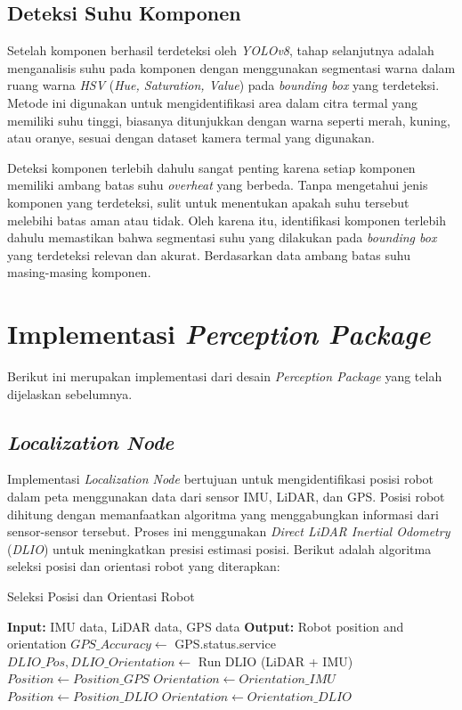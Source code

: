\subsection{Deteksi Suhu Komponen}
Setelah komponen berhasil terdeteksi oleh \emph{YOLOv8}, tahap selanjutnya adalah menganalisis suhu pada komponen dengan menggunakan segmentasi warna dalam ruang warna \emph{HSV} (\emph{Hue, Saturation, Value}) pada \emph{bounding box} yang terdeteksi. Metode ini digunakan untuk mengidentifikasi area dalam citra termal yang memiliki suhu tinggi, biasanya ditunjukkan dengan warna seperti merah, kuning, atau oranye, sesuai dengan dataset kamera termal yang digunakan.

Deteksi komponen terlebih dahulu sangat penting karena setiap komponen memiliki ambang batas suhu \emph{overheat} yang berbeda. Tanpa mengetahui jenis komponen yang terdeteksi, sulit untuk menentukan apakah suhu tersebut melebihi batas aman atau tidak. Oleh karena itu, identifikasi komponen terlebih dahulu memastikan bahwa segmentasi suhu yang dilakukan pada \emph{bounding box} yang terdeteksi relevan dan akurat. Berdasarkan data ambang batas suhu masing-masing komponen.

\section{Implementasi \emph{Perception Package}}
Berikut ini merupakan implementasi dari desain \emph{Perception Package} yang telah dijelaskan sebelumnya.

\subsection{\emph{Localization Node}}
Implementasi \emph{Localization Node} bertujuan untuk mengidentifikasi posisi robot dalam peta menggunakan data dari sensor IMU, LiDAR, dan GPS. Posisi robot dihitung dengan memanfaatkan algoritma yang menggabungkan informasi dari sensor-sensor tersebut. Proses ini menggunakan \emph{Direct LiDAR Inertial Odometry} (\emph{DLIO}) untuk meningkatkan presisi estimasi posisi. Berikut adalah algoritma seleksi posisi dan orientasi robot yang diterapkan:

\begin{algorithm}
    \caption{Seleksi Posisi dan Orientasi Robot}
    \begin{algorithmic}[1]
    \State \textbf{Input:} IMU data, LiDAR data, GPS data
    \State \textbf{Output:} Robot position and orientation
    \State $GPS\_Accuracy \gets$ GPS.status.service
    \State $DLIO\_Pos, DLIO\_Orientation \gets$ Run DLIO (LiDAR + IMU)
        \State $Position \gets Position\_GPS$
        \State $Orientation \gets Orientation\_IMU$
    \Else
        \State $Position \gets Position\_DLIO$
        \State $Orientation \gets Orientation\_DLIO$
    \EndIf
    \end{algorithmic}
\end{algorithm}


